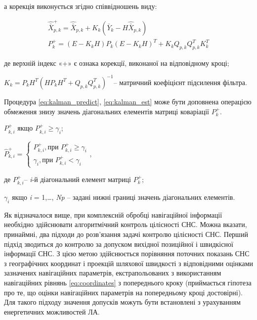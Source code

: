 а корекція виконується згідно співвідношень виду:

\begin{equation} \label{eq:kalman_est} \begin{array}{l} 
{\hat{\bar{X}}^{+}_{p,k}=\hat{\bar{X}}_{p,k} +K_{k} (\bar{Y}_{k} -H\hat{\bar{X}}_{p,k} )} \\ 
{P^{+}_{k}=(E-K_{k} H)P_{k} \left(E-K_{k} H\right)^{T} +K_{k} Q_{p,k} Q_{p,k} ^{T} K_{k}^{T} } 
\end{array} \end{equation} 

де верхній індекс «+» є ознака корекції, виконаної  на відповідному кроці;

$K_{k} =P_{k} H^{T} (HP_{k} H^{T} +Q_{p,k} Q_{p,k} ^{T} )^{-1} $-- матричний коефіцієнт 
підсилення фільтра.

Процедура \eqref{eq:kalman_predict}, \eqref{eq:kalman_est} може бути доповнена операцією 
обмеження знизу значень діагональних елементів матриці коваріації $P^{+}_{k} $.

$P_{k,i} ^{+} $  якщо  $P_{k,i} ^{+} \ge \gamma_{i} $;

$\hat{P}_{k,i} ^{+} =\left\{\begin{array}{l} {P_{k,i} ^{+} ,\text{при }P_{k,i} ^{+} \ge \gamma_{i} } \\ 
{\gamma_{i} ,\text{при } P_{k,i} ^{+} <\gamma_{i} } \end{array} \right. $, 

\begin{ESKDexplanation}
 \item де $P_{k,i} ^{+} $-- \textit{i}-й діагональний елемент матриці $P_{k} ^{+} $;
 \item $\gamma_{i} $ якщо \textit{i} = 1,\dots , \textit{Np} -- задані нижні границі 
значень діагональних елементів.
\end{ESKDexplanation}

Як відзначалося вище, при комплексній обробці навігаційної  інформації необхідно 
здійснювати алгоритмічний контроль цілісності СНС. Можна вказати, принаймні, два  
підходи до розв'язання задачі контролю цілісності СНС.  Перший підхід зводиться до 
контролю за допуском вихідної позиційної і швидкісної інформації СНС. З цією метою  
здійснюється порівняння поточних показань СНС з географічних координат і проекцій 
шляхової швидкості з відповідними оцінками зазначених навігаційних параметрів, екстрапольованих 
з використанням навігаційних рівнянь \eqref{eq:coordinates}
з попереднього кроку (приймається гіпотеза про те, що оцінки навігаційних параметрів 
на попередньому кроці достовірні). Для такого підходу значення допусків можуть бути 
встановлені з урахуванням енергетичних можливостей ЛА.

